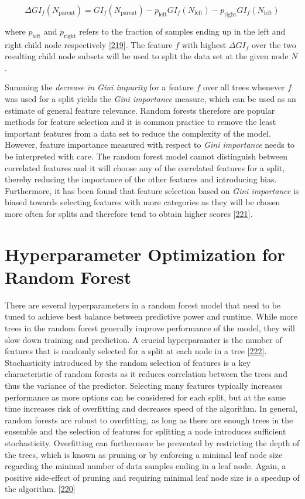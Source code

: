 \documentclass[11pt,a4paper,twoside]{book}
\theoremstyle{definition}
\theoremstyle{definition}
\theoremstyle{remark}
\begin{document}
\[
\Delta GI_f(N_{\textrm{parent}}) = GI_f(N_{\textrm{parent}}) - p_{\textrm{left}} GI_f(N_{\textrm{left}}) - p_{\textrm{right}} GI_f(N_{\textrm{left}})
\]

where \(p_{\textrm{left}}\) and \(p_{\textrm{right}}\) refers to the
fraction of samples ending up in the left and right child node
respectively {[}\protect\hyperlink{ref-Menze2009}{219}{]}. The feature
\(f\) with highest \(\Delta GI_f\) over the two resulting child node
subsets will be used to split the data set at the given node \(N\).

Summing the \emph{decrease in Gini impurity} for a feature \(f\) over
all trees whenever \(f\) was used for a split yields the \emph{Gini
importance} measure, which can be used as an estimate of general feature
relevance. Random forests therefore are popular methods for feature
selection and it is common practice to remove the least important
features from a data set to reduce the complexity of the model. However,
feature importance measured with respect to \emph{Gini importance} needs
to be interpreted with care. The random forest model cannot distinguish
between correlated features and it will choose any of the correlated
features for a split, thereby reducing the importance of the other
features and introducing bias. Furthermore, it has been found that
feature selection based on \emph{Gini importance} is biased towards
selecting features with more categories as they will be chosen more
often for splits and therefore tend to obtain higher scores
{[}\protect\hyperlink{ref-Strobl2007}{221}{]}.

\section{Hyperparameter Optimization for Random
Forest}\label{hyperparameter-optimization-for-random-forest}

There are several hyperparameters in a random forest model that need to
be tuned to achieve best balance between predictive power and runtime.
While more trees in the random forest generally improve performance of
the model, they will slow down training and prediction. A crucial
hyperparamter is the number of features that is randomly selected for a
split at each node in a tree
{[}\protect\hyperlink{ref-Bernard2009}{222}{]}. Stochasticity introduced
by the random selection of features is a key characteristic of random
forests as it reduces correlation between the trees and thus the
variance of the predictor. Selecting many features typically increases
performance as more options can be considered for each split, but at the
same time increases risk of overfitting and decreases speed of the
algorithm. In general, random forests are robust to overfitting, as long
as there are enough trees in the ensemble and the selection of features
for splitting a node introduces sufficient stochasticity. Overfitting
can furthermore be prevented by restricting the depth of the trees,
which is known as pruning or by enforcing a minimal leaf node size
regarding the minimal number of data samples ending in a leaf node.
Again, a positive side-effect of pruning and requiring minimal leaf node
size is a speedup of the algorithm.
{[}\protect\hyperlink{ref-Louppe2014}{220}{]}
\end{document}

